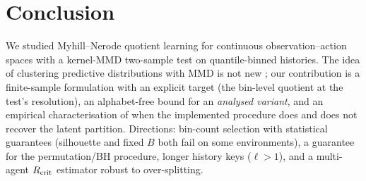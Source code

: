 \documentclass[10pt]{article}
\begin{document}
\section{Conclusion}
\label{sec:conclusion}

We studied Myhill--Nerode quotient learning for continuous observation--action
spaces with a kernel-MMD two-sample test on quantile-binned histories.  The idea
of clustering predictive distributions with MMD is not new
\citep{Brodu2022}; our contribution is a finite-sample formulation with an
explicit target (the bin-level quotient at the test's resolution),
an alphabet-free bound for an \emph{analysed variant}, and an empirical
characterisation of when the implemented procedure does and does not recover
the latent partition.  Directions: bin-count selection with statistical
guarantees (silhouette and fixed $B$ both fail on some environments), a
guarantee for the permutation/BH procedure, longer history keys ($\ell>1$), and
a multi-agent $R_{\rm crit}$ estimator robust to over-splitting.



\end{document}
